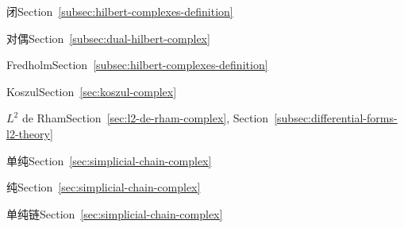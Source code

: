 \par\noindent\hspace*{2em}\label{index:complex-hilbert-closed}{闭}\quad Section~\ref{subsec:hilbert-complexes-definition}

\par\noindent\hspace*{2em}\label{index:complex-hilbert-dual}{对偶}\quad Section~\ref{subsec:dual-hilbert-complex}

\par\noindent\hspace*{2em}\label{index:complex-hilbert-fredholm}{Fredholm}\quad Section~\ref{subsec:hilbert-complexes-definition}

\par\noindent\hspace*{1em}\label{index:complex-koszul}{Koszul}\quad Section~\ref{sec:koszul-complex}

\par\noindent\hspace*{1em}\label{index:complex-l-2-de-rham}{$L^2$ de Rham}\quad Section~\ref{sec:l2-de-rham-complex}, Section~\ref{subsec:differential-forms-l2-theory}

\par\noindent\hspace*{1em}\label{index:complex-simplicial}{单纯}\quad Section~\ref{sec:simplicial-chain-complex}

\par\noindent\hspace*{2em}\label{index:complex-simplicial-pure}{纯}\quad Section~\ref{sec:simplicial-chain-complex}

\par\noindent\hspace*{1em}\label{index:complex-simplicial-chain}{单纯链}\quad Section~\ref{sec:simplicial-chain-complex}

